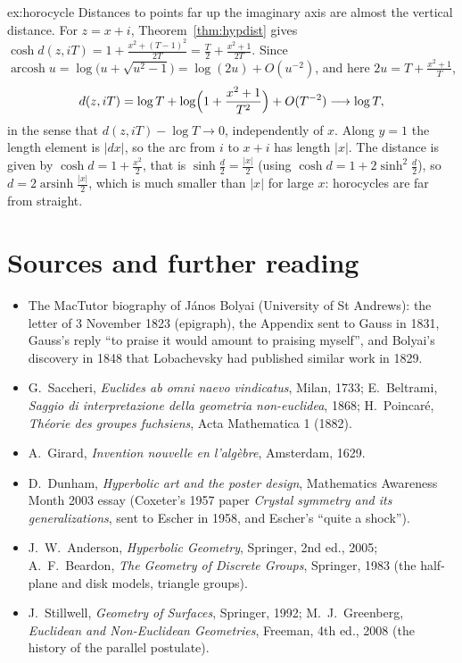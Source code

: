 \begin{solution}{ex:horocycle}
\idea Distances to points far up the imaginary axis are almost the vertical distance.
\writeup For $z=x+i$, Theorem~\ref{thm:hypdist} gives $\cosh d(z,iT)=1+\frac{x^2+(T-1)^2}{2T}=\frac{T}2+\frac{x^2+1}{2T}$. Since $\operatorname{arcosh}u=\log\bigl(u+\sqrt{u^2-1}\bigr)=\log(2u)+O(u^{-2})$, and here $2u=T+\frac{x^2+1}T$,
\[
d(z,iT)=\log T+\log\Bigl(1+\frac{x^2+1}{T^2}\Bigr)+O(T^{-2})\longrightarrow\log T,
\]
in the sense that $d(z,iT)-\log T\to0$, independently of $x$. Along $y=1$ the length
element is $|dx|$, so the arc from $i$ to $x+i$ has length $|x|$. The distance is given by $\cosh d=1+\frac{x^2}2$, that is $\sinh\frac d2=\frac{|x|}2$
(using $\cosh d=1+2\sinh^2\frac d2$), so $d=2\operatorname{arsinh}\frac{|x|}2$, which is much smaller than $|x|$ for large $x$: horocycles are far from straight.
\end{solution}

\section*{Sources and further reading}

\begin{itemize}
\item The MacTutor biography of J\'anos Bolyai (University of St Andrews): the letter of 3 November 1823 (epigraph), the Appendix sent to Gauss in 1831, Gauss's
reply ``to praise it would amount to praising myself'', and Bolyai's discovery in 1848 that Lobachevsky had published similar work in 1829.
\item G.~Saccheri, \emph{Euclides ab omni naevo vindicatus}, Milan, 1733; E.~Beltrami, \emph{Saggio di interpretazione della geometria non-euclidea}, 1868;
H.~Poincar\'e, \emph{Th\'eorie des groupes fuchsiens}, Acta Mathematica 1 (1882).
\item A.~Girard, \emph{Invention nouvelle en l'alg\`ebre}, Amsterdam, 1629.
\item D.~Dunham, \emph{Hyperbolic art and the poster design}, Mathematics Awareness Month 2003 essay (Coxeter's 1957 paper \emph{Crystal symmetry and its
generalizations}, sent to Escher in 1958, and Escher's ``quite a shock'').
\item J.~W.~Anderson, \emph{Hyperbolic Geometry}, Springer, 2nd ed., 2005; A.~F.~Beardon, \emph{The Geometry of Discrete Groups}, Springer, 1983 (the half-plane and
disk models, triangle groups).
\item J.~Stillwell, \emph{Geometry of Surfaces}, Springer, 1992; M.~J.~Greenberg, \emph{Euclidean and Non-Euclidean Geometries}, Freeman, 4th ed., 2008 (the history
of the parallel postulate).
\end{itemize}
